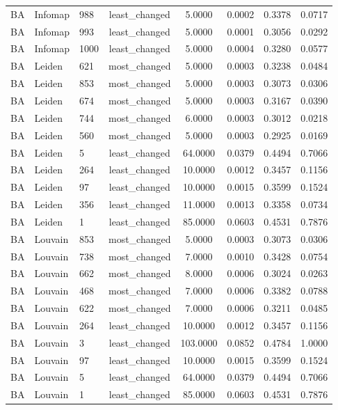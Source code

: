 \begin{longtable}{lllccccc}
BA & Infomap & 988 & least\_changed & 5.0000 & 0.0002 & 0.3378 & 0.0717 \\
BA & Infomap & 993 & least\_changed & 5.0000 & 0.0001 & 0.3056 & 0.0292 \\
BA & Infomap & 1000 & least\_changed & 5.0000 & 0.0004 & 0.3280 & 0.0577 \\
BA & Leiden & 621 & most\_changed & 5.0000 & 0.0003 & 0.3238 & 0.0484 \\
BA & Leiden & 853 & most\_changed & 5.0000 & 0.0003 & 0.3073 & 0.0306 \\
BA & Leiden & 674 & most\_changed & 5.0000 & 0.0003 & 0.3167 & 0.0390 \\
BA & Leiden & 744 & most\_changed & 6.0000 & 0.0003 & 0.3012 & 0.0218 \\
BA & Leiden & 560 & most\_changed & 5.0000 & 0.0003 & 0.2925 & 0.0169 \\
BA & Leiden & 5 & least\_changed & 64.0000 & 0.0379 & 0.4494 & 0.7066 \\
BA & Leiden & 264 & least\_changed & 10.0000 & 0.0012 & 0.3457 & 0.1156 \\
BA & Leiden & 97 & least\_changed & 10.0000 & 0.0015 & 0.3599 & 0.1524 \\
BA & Leiden & 356 & least\_changed & 11.0000 & 0.0013 & 0.3358 & 0.0734 \\
BA & Leiden & 1 & least\_changed & 85.0000 & 0.0603 & 0.4531 & 0.7876 \\
BA & Louvain & 853 & most\_changed & 5.0000 & 0.0003 & 0.3073 & 0.0306 \\
BA & Louvain & 738 & most\_changed & 7.0000 & 0.0010 & 0.3428 & 0.0754 \\
BA & Louvain & 662 & most\_changed & 8.0000 & 0.0006 & 0.3024 & 0.0263 \\
BA & Louvain & 468 & most\_changed & 7.0000 & 0.0006 & 0.3382 & 0.0788 \\
BA & Louvain & 622 & most\_changed & 7.0000 & 0.0006 & 0.3211 & 0.0485 \\
BA & Louvain & 264 & least\_changed & 10.0000 & 0.0012 & 0.3457 & 0.1156 \\
BA & Louvain & 3 & least\_changed & 103.0000 & 0.0852 & 0.4784 & 1.0000 \\
BA & Louvain & 97 & least\_changed & 10.0000 & 0.0015 & 0.3599 & 0.1524 \\
BA & Louvain & 5 & least\_changed & 64.0000 & 0.0379 & 0.4494 & 0.7066 \\
BA & Louvain & 1 & least\_changed & 85.0000 & 0.0603 & 0.4531 & 0.7876 \\

\end{longtable}
